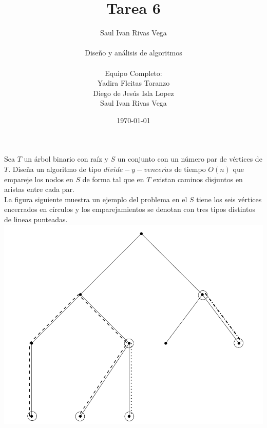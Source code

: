 \documentclass[12pt]{article}
\title{Tarea 6}
\author{
	Saul Ivan Rivas Vega \\
	\\
	Diseño y análisis de algoritmos\\
\\
	Equipo Completo:\\
		Yadira Fleitas Toranzo\\
		Diego de Jesús Isla Lopez\\
		Saul Ivan Rivas Vega\\
}
\date{\today}
\begin{document}
	\maketitle
	\pagebreak
	\section{}
	  \paragraph{} Sea $T$ un árbol binario con raíz y $S$ un conjunto con un número par de vértices de $T$. Diseña un algoritmo de tipo $divide-y-vencer\acute{a}s$ de tiempo $O(n)$ que empareje los nodos en $S$ de forma tal que en $T$ existan caminos disjuntos en aristas entre cada par.
	  \\ La figura siguiente muestra un ejemplo del problema en el $S$ tiene los seis vértices encerrados en círculos y los emparejamientos se denotan con tres tipos distintos de lineas punteadas.
	  \\
	  \includegraphics[width=\textwidth]{tree_1}
	  \pagebreak
\end{document}
